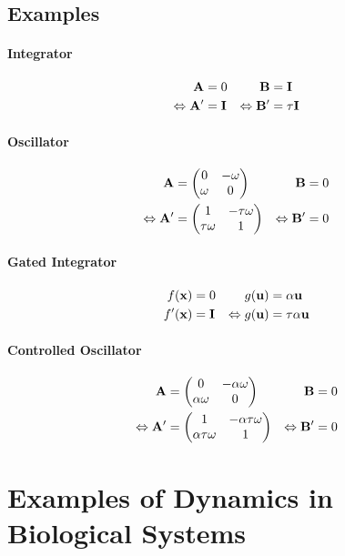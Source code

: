 \documentclass[10pt,letterpaper,oneside]{article}
\begin{document}
\ConstructionSite


\subsection{Examples}

\ConstructionSite

\paragraph{Integrator}

\begin{align*}
	{\mathbf{A}} &= 0 & {\mathbf{B}} &= {\mathbf{I}} \\
	\Leftrightarrow {\mathbf{A}}' &= {\mathbf{I}}  & \Leftrightarrow {\mathbf{B}}' &= \tau {\mathbf{I}}
\end{align*}

\paragraph{Oscillator}

\begin{align*}
	{\mathbf{A}} &= \begin{pmatrix}0 & -\omega \\ \omega & 0\end{pmatrix} & {\mathbf{B}} &= 0 \\
	\Leftrightarrow {\mathbf{A}}' &= \begin{pmatrix}1 & -\tau\omega \\ \tau \omega & 1\end{pmatrix}  & \Leftrightarrow {\mathbf{B}}' &= 0
\end{align*}

\paragraph{Gated Integrator}

\begin{align*}
	f({\mathbf{x}}) &= 0 & g({\mathbf{u}}) &= \alpha {\mathbf{u}} \\
	f'({\mathbf{x}}) &= {\mathbf{I}} & \Leftrightarrow g({\mathbf{u}}) &= \tau \alpha {\mathbf{u}}
\end{align*}

\paragraph{Controlled Oscillator}

\begin{align*}
	{\mathbf{A}} &= \begin{pmatrix}0 & -\alpha\omega \\ \alpha\omega & 0\end{pmatrix} & {\mathbf{B}} &= 0 \\
	\Leftrightarrow {\mathbf{A}}' &= \begin{pmatrix}1 & -\alpha\tau\omega \\ \alpha\tau \omega & 1\end{pmatrix}  & \Leftrightarrow {\mathbf{B}}' &= 0
\end{align*}

\section{Examples of Dynamics in Biological Systems}

\ConstructionSite

\printbibliography
\end{document}
